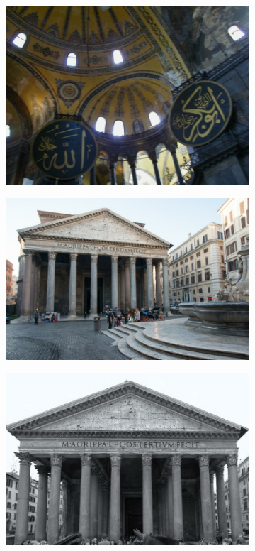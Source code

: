 \begin{figure}
\begin{subfigure}{.5\textwidth}
	\end{subfigure}%
	\begin{subfigure}{.5\textwidth}
		\centering
		\includegraphics[width=.9\textwidth]{../graphics/hagia_01058134_62294335.jpg}
	\end{subfigure}
	\begin{subfigure}{.5\textwidth}
		\centering
		\includegraphics[width=.9\textwidth]{../graphics/pantheon_00488011_10505838106.jpg}
	\end{subfigure}%
	\begin{subfigure}{.5\textwidth}
		\centering
		\includegraphics[width=.9\textwidth]{../graphics/pantheon_00927614_8536847775.jpg}

\end{subfigure}
\end{figure}
